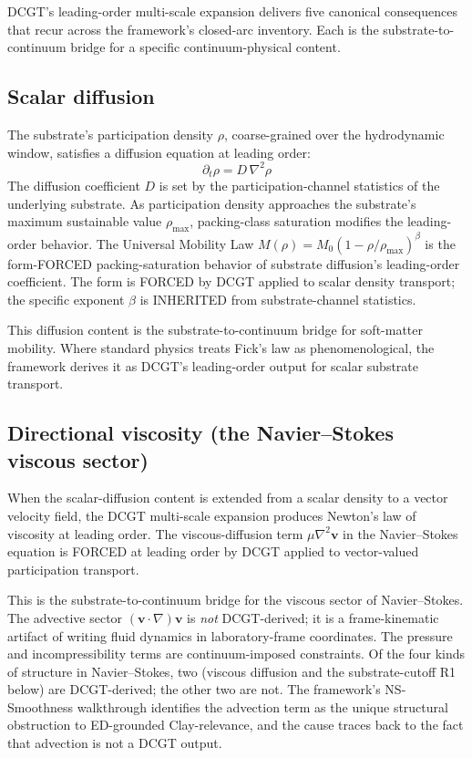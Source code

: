 \documentclass[11pt,a4paper]{article}
\begin{document}
DCGT's leading-order multi-scale expansion delivers five canonical consequences that recur across the framework's closed-arc inventory. Each is the substrate-to-continuum bridge for a specific continuum-physical content.

\subsection{Scalar diffusion}

The substrate's participation density $\rho$, coarse-grained over the hydrodynamic window, satisfies a diffusion equation at leading order:
\[
\partial_t \rho = D\, \nabla^{2} \rho
\]
The diffusion coefficient $D$ is set by the participation-channel statistics of the underlying substrate. As participation density approaches the substrate's maximum sustainable value $\rho_{\max}$, packing-class saturation modifies the leading-order behavior. The Universal Mobility Law $M(\rho) = M_0 (1 - \rho/\rho_{\max})^\beta$ is the form-FORCED packing-saturation behavior of substrate diffusion's leading-order coefficient. The form is FORCED by DCGT applied to scalar density transport; the specific exponent $\beta$ is INHERITED from substrate-channel statistics.

This diffusion content is the substrate-to-continuum bridge for soft-matter mobility. Where standard physics treats Fick's law as phenomenological, the framework derives it as DCGT's leading-order output for scalar substrate transport.

\subsection{Directional viscosity (the Navier--Stokes viscous sector)}

When the scalar-diffusion content is extended from a scalar density to a vector velocity field, the DCGT multi-scale expansion produces Newton's law of viscosity at leading order. The viscous-diffusion term $\mu \nabla^2 \mathbf{v}$ in the Navier--Stokes equation is FORCED at leading order by DCGT applied to vector-valued participation transport.

This is the substrate-to-continuum bridge for the viscous sector of Navier--Stokes. The advective sector $(\mathbf{v} \cdot \nabla) \mathbf{v}$ is \emph{not} DCGT-derived; it is a frame-kinematic artifact of writing fluid dynamics in laboratory-frame coordinates. The pressure and incompressibility terms are continuum-imposed constraints. Of the four kinds of structure in Navier--Stokes, two (viscous diffusion and the substrate-cutoff R1 below) are DCGT-derived; the other two are not. The framework's NS-Smoothness walkthrough identifies the advection term as the unique structural obstruction to ED-grounded Clay-relevance, and the cause traces back to the fact that advection is not a DCGT output.
\end{document}
